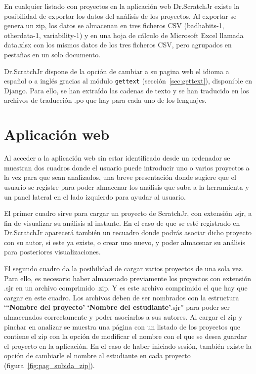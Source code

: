 \documentclass[a4paper, 12pt]{book}
\begin{document}
En cualquier listado con proyectos en la aplicación web Dr.ScratchJr existe la posibilidad de exportar los datos del análisis de los proyectos. 
Al exportar se genera un zip, los datos se almacenan en tres ficheros CSV (badhabits-1, otherdata-1, variability-1) y en una hoja de cálculo de Microsoft Excel llamada data.xlsx con los mismos datos de los tres ficheros CSV, pero agrupados en pestañas en un solo documento.

\vspace{4mm}
Dr.ScratchJr dispone de la opción de cambiar a su pagina web el idioma a español o a inglés gracias al módulo \texttt{gettext} (sección~\ref{sec:gettext}), disponible en Django. Para ello, se han extraído las cadenas de texto y se han traducido en los archivos de traducción .po que hay para cada uno de los lenguajes. 

\section{Aplicación web}
\label{sec:aplicacion-web}

Al acceder a la aplicación web sin estar identificado desde un ordenador se muestran dos cuadros donde el usuario puede introducir uno o varios proyectos a la vez para que sean analizados, una breve presentación donde sugiere que el usuario se registre para poder almacenar los análisis que suba a la herramienta y un panel lateral en el lado izquierdo para ayudar al usuario.

El primer cuadro sirve para cargar un proyecto de ScratchJr, con extensión .sjr, a fin de visualizar su análisis al instante.
En el caso de que se esté registrado en Dr.ScratchJr aparecerá también un recuadro donde podrás asociar dicho proyecto con su autor, si este ya existe, o crear uno nuevo, y poder almacenar su análisis para posteriores visualizaciones.

El segundo cuadro da la posibilidad de cargar varios proyectos de una sola vez.
Para ello, es necesario haber almacenado previamente los proyectos con extensión .sjr en un archivo comprimido .zip. Y es este archivo comprimido el que hay que cargar en este cuadro.
Los archivos deben de ser nombrados con la estructura ``\textbf{`Nombre del proyecto'}-\textbf{`Nombre del estudiante'}.sjr'' para poder ser almacenados correctamente y poder asociarlos a sus autores.
Al cargar el zip y pinchar en analizar se muestra una página con un listado de los proyectos que contiene el zip con la opción de modificar el nombre con el que se desea guardar el proyecto en la aplicación.
En el caso de haber iniciado sesión, también existe la opción de cambiarle el nombre al estudiante en cada proyecto (figura~\ref{fig:pag_subida_zip}).
\end{document}
